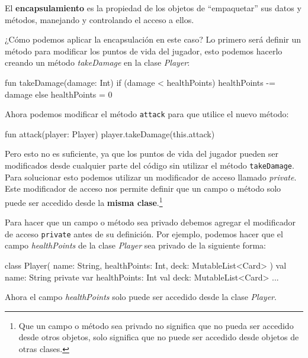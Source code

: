   \begin{defaultbox}[Encapsulamiento]
    El \textbf{encapsulamiento} es la propiedad de los objetos de \enquote{empaquetar} sus datos y 
    métodos, manejando y controlando el acceso a ellos.
  \end{defaultbox}

  ¿Cómo podemos aplicar la encapsulación en este caso?
  Lo primero será definir un método para modificar los puntos de vida del jugador, esto podemos
  hacerlo creando un método \textit{takeDamage} en la clase \textit{Player}:

  \begin{kotlin}
    fun takeDamage(damage: Int) {
      if (damage < healthPoints) {
        healthPoints -= damage
      } else {
        healthPoints = 0
      }
    }
  \end{kotlin}

  Ahora podemos modificar el método \texttt{attack} para que utilice el nuevo método:

  \begin{kotlin}
    fun attack(player: Player) {
      player.takeDamage(this.attack)
    }
  \end{kotlin}

  Pero esto no es suficiente, ya que los puntos de vida del jugador pueden ser modificados desde
  cualquier parte del código sin utilizar el método \texttt{takeDamage}.
  Para solucionar esto podemos utilizar un modificador de acceso llamado \textit{private}.
  Este modificador de acceso nos permite definir que un campo o método solo puede ser accedido
  desde la \textbf{misma clase}.\footnote{Que un campo o método sea privado no significa que no
  pueda ser accedido desde otros objetos, solo significa que no puede ser accedido desde objetos 
  de otras clases.}

  Para hacer que un campo o método sea privado debemos agregar el modificador de acceso
  \texttt{private} antes de su definición.
  Por ejemplo, podemos hacer que el campo \textit{healthPoints} de la clase \textit{Player} sea
  privado de la siguiente forma:

  \begin{kotlin}
    class Player(
      name: String,
      healthPoints: Int,
      deck: MutableList<Card>
    ) {
      val name: String
      private var healthPoints: Int
      val deck: MutableList<Card>
      ...
    }
  \end{kotlin}

  Ahora el campo \textit{healthPoints} solo puede ser accedido desde la clase \textit{Player}.

